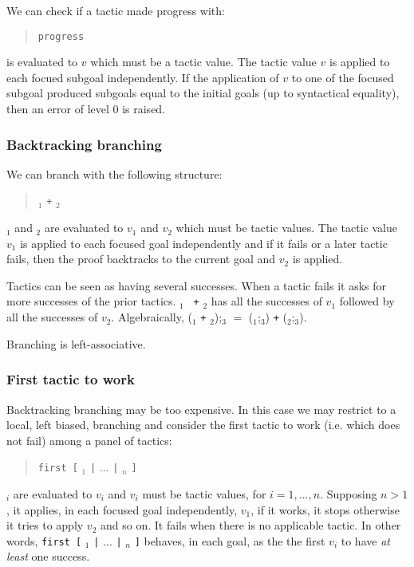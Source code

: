 We can check if a tactic made progress with:
\begin{quote}
{\tt progress} {\tacexpr}
\end{quote}
{\tacexpr} is evaluated to $v$ which must be a tactic value.
The tactic value $v$ is
applied to each focued subgoal independently. If the application of
$v$ to one of the focused subgoal produced subgoals equal to the
initial goals (up to syntactical equality), then an error of level 0
is raised.

\ErrMsg {}

\subsubsection[Backtracking branching]{Backtracking branching\tacindex{$+$}
}

We can branch with the following structure:
\begin{quote}
{\tacexpr}$_1$ {\tt +} {\tacexpr}$_2$
\end{quote}
{\tacexpr}$_1$ and {\tacexpr}$_2$ are evaluated to $v_1$ and
$v_2$ which must be tactic values. The tactic value $v_1$ is applied to each
focused goal independently and if it fails or a later tactic fails,
then the proof backtracks to the current goal and $v_2$ is applied.

Tactics can be seen as having several successes. When a tactic fails
it asks for more successes of the prior tactics. {\tacexpr}$_1$ {\tt
  +} {\tacexpr}$_2$ has all the successes of $v_1$ followed by all the
successes of $v_2$. Algebraically, ({\tacexpr}$_1$ {\tt +}
{\tacexpr}$_2$);{\tacexpr}$_3$ $=$ ({\tacexpr}$_1$;{\tacexpr}$_3$)
{\tt +} ({\tacexpr}$_2$;{\tacexpr}$_3$).

Branching is left-associative.

\subsubsection[First tactic to work]{First tactic to work
}

Backtracking branching may be too expensive. In this case we may
restrict to a local, left biased, branching and consider the first
tactic to work (i.e. which does not fail) among a panel of tactics:
\begin{quote}
{\tt first [} {\tacexpr}$_1$ {\tt |} $...$ {\tt |} {\tacexpr}$_n$ {\tt ]}
\end{quote}
{\tacexpr}$_i$ are evaluated to $v_i$ and $v_i$ must be tactic values,
for $i=1,...,n$. Supposing $n>1$, it applies, in each focused goal
independently, $v_1$, if it works, it stops otherwise it tries to
apply $v_2$ and so on. It fails when there is no applicable tactic. In
other words, {\tt first [} {\tacexpr}$_1$ {\tt |} $...$ {\tt |}
  {\tacexpr}$_n$ {\tt ]} behaves, in each goal, as the the first $v_i$
to have \emph{at least} one success.

